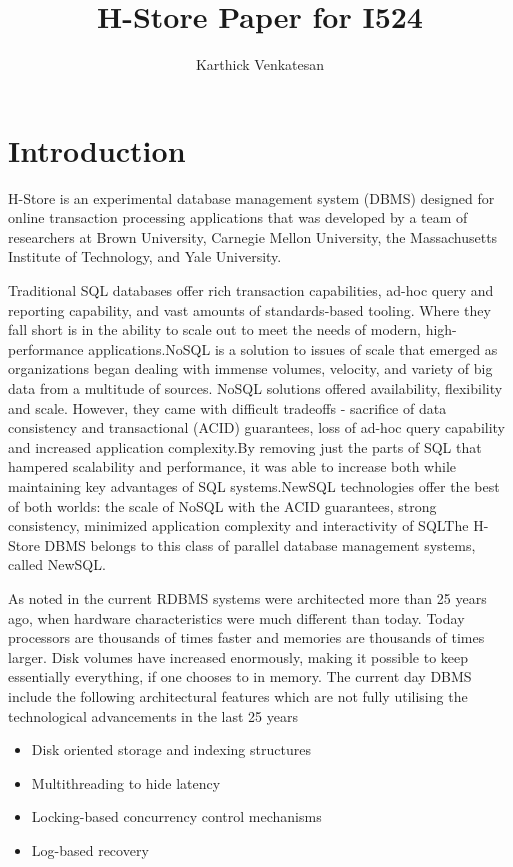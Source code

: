 \documentclass[9pt,twocolumn,twoside]{styles/osajnl}
\title{H-Store Paper for I524}
\author[1,*,+]{Karthick Venkatesan}
\affil[1]{School of Informatics and Computing, Bloomington, IN 47408, U.S.A.}
\affil[*]{Corresponding authors: vkarthickprabu@gmail.com}
\affil[+]{HID - S17-IO-3023}
\begin{document}
\maketitle

\section{Introduction}

H-Store is an experimental database management system (DBMS) designed for online transaction processing applications 
that was developed by a team of researchers  at Brown University, Carnegie Mellon University, the Massachusetts Institute of Technology, and Yale University.

Traditional SQL databases offer rich transaction capabilities, ad-hoc query and reporting capability, and vast amounts of standards-based tooling. Where they fall short is in the ability to scale out to meet the needs of modern, high-performance applications.NoSQL is  a solution to issues of scale that emerged as organizations began dealing with immense volumes, velocity, and variety of big data from a multitude of sources. NoSQL solutions offered availability, flexibility and scale. However, they came with difficult tradeoffs - sacrifice of data consistency and transactional (ACID) guarantees, loss of ad-hoc query capability and increased application complexity.By removing just the parts of SQL that hampered scalability and performance, it was able to increase both while maintaining key advantages of SQL systems.NewSQL technologies offer the best of both worlds: the scale of NoSQL with the ACID guarantees, strong consistency, minimized application complexity and interactivity of SQLThe H-Store DBMS belongs to this class of parallel database management systems, called NewSQL.

As noted in \cite{stonebraker2007} the current RDBMS systems were architected more than 25 years ago, when
hardware characteristics were much different than today.
Today processors are thousands of times faster and memories are
thousands of times larger. Disk volumes have increased
enormously, making it possible to keep essentially everything, if
one chooses to in memory. The current day DBMS 
include the following architectural features which are not fully utilising 
the technological advancements in the last 25 years
\begin{itemize}
\renewcommand{\labelitemi}{\scriptsize$\bullet$} 
\item Disk oriented storage and indexing structures
\item Multithreading to hide latency
\item Locking-based concurrency control mechanisms
\item Log-based recovery
\end{itemize}
\end{document}
